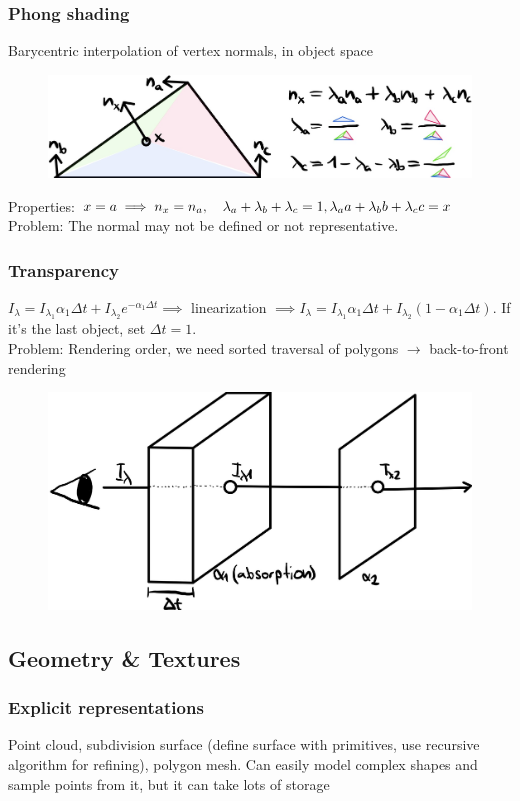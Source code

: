 \documentclass[a4paper,10pt]{article}
\begin{document}
\subsubsection{Phong shading} Barycentric interpolation of vertex normals, in object space
\begin{figure}[H]
    \includegraphics[width=\linewidth]{phong-shading.jpeg}
\end{figure}

Properties: \( x = a \implies n_x = n_a, \quad \lambda_a+\lambda_b +\lambda_c = 1, \\ \lambda_a a+ \lambda_b b + \lambda_c c = x \)
Problem: The normal may not be defined or not representative.

\subsubsection{Transparency} \( I_\lambda = I_{\lambda_1} \alpha_1 \Delta t + I_{\lambda_2} e^{-\alpha_1 \Delta t} \implies \) linearization \( \implies I_\lambda = I_{\lambda_1} \alpha_1 \Delta t + I_{\lambda_2} (1-\alpha_1 \Delta t) \). If it's the last object, set \( \Delta t = 1 \). \\
Problem: Rendering order, we need sorted traversal of polygons \( \to  \) back-to-front rendering

\begin{figure}[h]
    \centering
    \includegraphics[width=0.6\linewidth]{transparency.jpeg}
\end{figure}

\subsection{Geometry \& Textures}
\subsubsection{Explicit representations} Point cloud, subdivision surface (define surface with primitives, use recursive algorithm for refining), polygon mesh. Can easily model complex shapes and sample points from it, but it can take lots of storage
\end{document}
